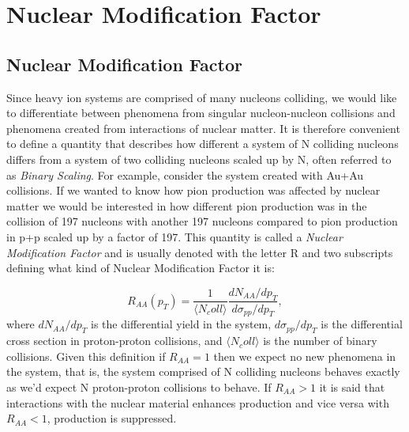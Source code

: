 \chapter{Nuclear Modification Factor} %
\label{nuclmodfactapp}

\section{Nuclear Modification Factor}
Since heavy ion systems are comprised of many nucleons colliding, we would like to differentiate between phenomena from singular nucleon-nucleon collisions and phenomena created from interactions of nuclear matter. It is therefore convenient to define a quantity that describes how different a system of N colliding nucleons differs from a system of two colliding nucleons scaled up by N, often referred to as \textit{Binary Scaling}. For example, consider the system created with Au+Au collisions. If we wanted to know how pion production was affected by nuclear matter we would be interested in how different pion production was in the collision of 197 nucleons with another 197 nucleons compared to pion production in p+p scaled up by a factor of 197. This quantity is called a \textit{Nuclear Modification Factor} and is usually denoted with the letter R and two subscripts defining what kind of Nuclear Modification Factor it is:

\begin{equation}
R_{AA}(p_{T}) = \frac{1}{\langle N_coll \rangle} \frac{dN_{AA}/dp_{T}}{d\sigma_{pp}/dp_{T}},
\end{equation}
where $dN_{AA}/dp_{T}$ is the differential yield in the system, $d\sigma_{pp}/dp_{T}$ is the differential cross section in proton-proton collisions, and $\langle N_coll \rangle$ is the number of binary collisions. Given this definition if $R_{AA}=1$ then we expect no new phenomena in the system, that is, the system comprised of N colliding nucleons behaves exactly as we'd expect N proton-proton collisions to behave. If $R_{AA}>1$ it is said that interactions with the nuclear material enhances production and vice versa with $R_{AA}<1$, production is suppressed.